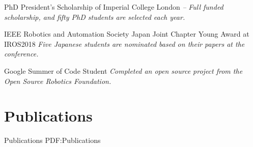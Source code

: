 \documentclass[letterpaper,MMMyyyy,nonstop]{simpleresumecv}
\begin{document}
\begin{body}
PhD President's Scholarship of Imperial College London
\hfill
{\it {} -- }
\newline
{\it Full funded scholarship, and fifty PhD students are selected each year.}

\BigGapNoBreak
IEEE Robotics and Automation Society Japan Joint Chapter Young Award at IROS2018
\hfill
{\it {}}
\newline
{\it Five Japanese students are nominated based on their papers at the conference.}


\BigGapNoBreak
Google Summer of Code Student
\hfill
{\it {}}
\newline
{\it Completed an open source project from the Open Source Robotics Foundation.}



\section
{Publications}
{Publications}
{PDF:Publications}





\end{body}
\end{document}
